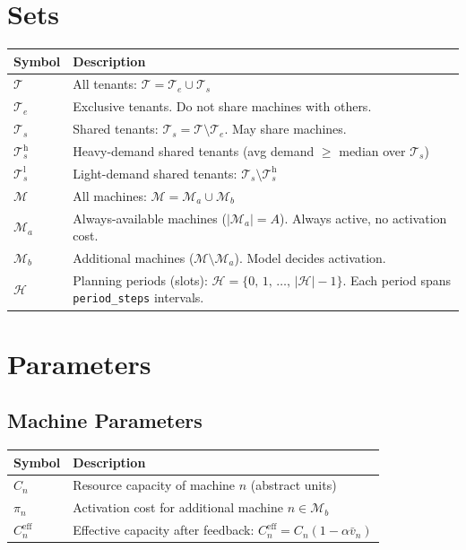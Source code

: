\documentclass[11pt,a4paper]{article}
\newcommand{\T}{\mathcal{T}}
\newcommand{\Te}{\mathcal{T}_e}
\newcommand{\Ts}{\mathcal{T}_s}
\newcommand{\Th}{\mathcal{T}_s^{\mathrm{h}}}
\newcommand{\Tl}{\mathcal{T}_s^{\mathrm{l}}}
\newcommand{\M}{\mathcal{M}}
\newcommand{\Ma}{\mathcal{M}_a}
\newcommand{\Mb}{\mathcal{M}_b}
\newcommand{\PH}{\mathcal{H}}
\newcommand{\Ceff}{C^{\mathrm{eff}}}
\begin{document}
\section{Sets}

\begin{center}
\begin{tabular}{p{2.2cm} p{11cm}}
\toprule
Symbol & Description \\
\midrule
$\T$ & All tenants: $\T = \Te \cup \Ts$ \\
$\Te$ & Exclusive tenants. Do not share machines with others. \\
$\Ts$ & Shared tenants: $\Ts = \T \setminus \Te$. May share machines. \\
$\Th$ & Heavy-demand shared tenants (avg demand $\geq$ median over $\Ts$) \\
$\Tl$ & Light-demand shared tenants: $\Ts \setminus \Th$ \\
$\M$ & All machines: $\M = \Ma \cup \Mb$ \\
$\Ma$ & Always-available machines ($|\Ma|=A$). Always active, no activation cost. \\
$\Mb$ & Additional machines ($\M \setminus \Ma$). Model decides activation. \\
$\PH$ & Planning periods (slots): $\PH = \{0,\,1,\,\ldots,\,|\PH|-1\}$. Each period spans \texttt{period\_steps} intervals. \\
\bottomrule
\end{tabular}
\end{center}

\section{Parameters}

\subsection*{Machine Parameters}
\begin{center}
\begin{tabular}{p{2.5cm} p{10cm}}
\toprule
Symbol & Description \\
\midrule
$C_n$ & Resource capacity of machine $n$ (abstract units) \\
$\pi_n$ & Activation cost for additional machine $n \in \Mb$ \\
$\Ceff_n$ & Effective capacity after feedback: $\Ceff_n = C_n(1-\alpha\bar{v}_n)$ \\
\bottomrule
\end{tabular}
\end{center}
\end{document}
